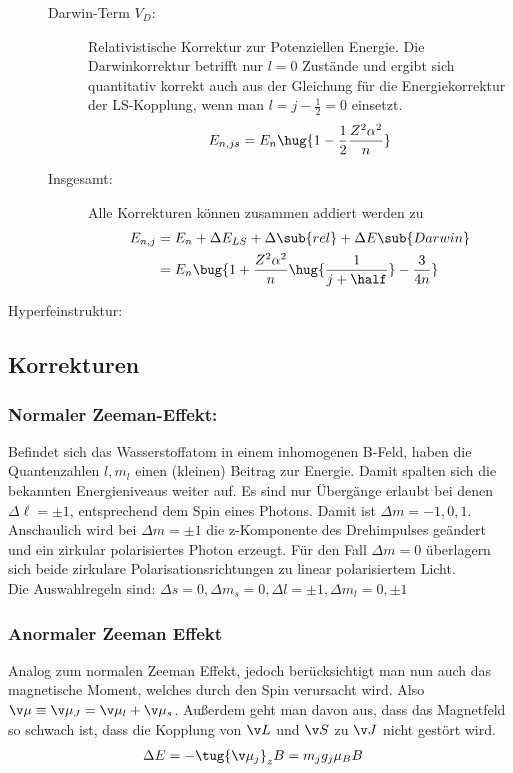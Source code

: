 \documentclass[twocolumn]{summery_4.1}
\begin{document}
\begin{description}
\begin{description}
        \item[Darwin-Term \(V_D\):] Relativistische Korrektur zur Potenziellen Energie. Die Darwinkorrektur betrifft nur \(l=0\) Zustände und ergibt sich quantitativ korrekt auch aus der Gleichung für die Energiekorrektur der LS-Kopplung, wenn man \(l=j-\frac12 =0\) einsetzt.
        \begin{align*}
            E_{n,js} = E_n\hug{1 - \frac{1}{2}\frac{Z^2\alpha^2}{n}}
        \end{align*}

        \item[Insgesamt:] Alle Korrekturen können zusammen addiert werden zu 
        \begin{align*}
            E_{n,j} &= E_n + \Delta E_{LS} + \Delta\sub{rel} + \Delta E\sub{Darwin}\\ 
            &= E_n \bug{1 + \frac{Z^2 \alpha^2}{n} \hug{\frac{1}{j + \half}}- \frac{3}{4n}}
        \end{align*}
    \end{description}


    \item[Hyperfeinstruktur:]
\end{description}



\subsection{Korrekturen}

\subsubsection{Normaler Zeeman-Effekt:}
Befindet sich das Wasserstoffatom in einem inhomogenen B-Feld, haben die Quantenzahlen \(l,m_l\) einen (kleinen) Beitrag zur Energie. Damit spalten sich die bekannten Energieniveaus weiter auf.     
Es sind nur Übergänge erlaubt bei denen \(\Delta \ell=\pm 1\), entsprechend dem Spin eines Photons. Damit ist \(\Delta m = -1,0,1\).
Anschaulich wird bei $\Delta m = \pm1$ die z-Komponente des Drehimpulses geändert
und ein zirkular polarisiertes Photon erzeugt. Für den Fall $\Delta m = 0$ überlagern sich beide zirkulare
Polarisationsrichtungen zu linear polarisiertem Licht.\\
Die Auswahlregeln sind: \(\Delta s = 0, \Delta m_s=0, \Delta l =\pm 1, \Delta m_l = 0,\pm1\)

\subsubsection{Anormaler Zeeman Effekt}
Analog zum normalen Zeeman Effekt, jedoch berücksichtigt man nun auch das magnetische Moment, welches durch den Spin verursacht wird. 
Also \(\v \mu \equiv \v \mu_J = \v \mu_l + \v \mu_s\). Außerdem geht man davon aus, dass das Magnetfeld so schwach ist, dass die Kopplung von \(\v L\) und \(\v S\) zu \(\v J\) nicht gestört wird. 
\begin{align*}
    \Delta E &= - \tug{\v \mu_j}_z B = m_j g_j \mu_B B
\end{align*}
\end{document}
